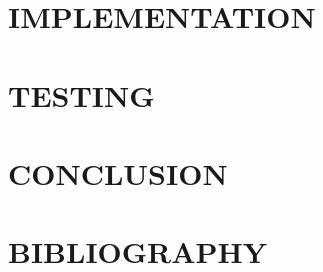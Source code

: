 \clearpage
\section{IMPLEMENTATION}


\clearpage
\section{TESTING}


\clearpage
\section{CONCLUSION}




\clearpage
\section{BIBLIOGRAPHY}
\printbibliography[heading=none]

\clearpage
\renewcommand{\listfigurename}{LIST OF FIGURES}
\listoffigures

\clearpage
\renewcommand{\listtablename}{LIST OF TABLES}
\listoftables

\clearpage



